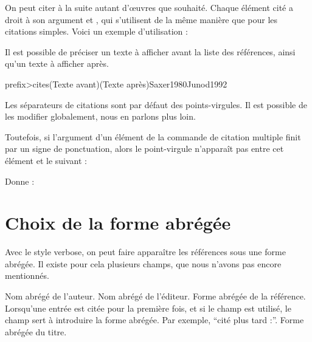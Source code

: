On peut  citer à la suite autant d'œuvres que souhaité. Chaque élément cité a droit à son argument  et , qui s'utilisent de la même manière que pour les citations simples.
Voici un exemple d'utilisation : 

\begin{latexcode}
\autocites{Saxer1980}{Junod1992}
\end{latexcode}

\begin{quotation}
\cites{Saxer1980}{Junod1992}
\end{quotation}

Il est possible de préciser un texte à afficher avant la liste des références, ainsi qu'un texte à afficher après.

\begin{latexcode}
\<prefix>cites(Texte avant)(Texte après){Saxer1980}{Junod1992}
\end{latexcode}

Les séparateurs de citations sont par défaut des points-virgules. Il est possible de les modifier globalement, nous en parlons plus loin.

Toutefois, si l'argument  d'un élément de la commande de citation multiple finit par un signe de ponctuation, alors le point-virgule n'apparaît pas entre cet élément et le suivant :

\begin{latexcode}
\autocites[on consultera également :]{Saxer1980}{Junod1992}
\end{latexcode}

Donne :

\begin{quotation}
\cites[on consultera également :]{Saxer1980}{Junod1992}
\end{quotation}




\section{Choix de la forme abrégée}\label{shortfields}

Avec le style verbose, on peut faire apparaître les références sous une forme abrégée. Il existe pour cela plusieurs champs, que nous n'avons pas encore mentionnés.

\begin{fieldlist}
     Nom abrégé de l'auteur.
     Nom abrégé de l'éditeur.
     Forme abrégée de la référence.
     Lorsqu'une entrée est citée pour la première fois, et si le champ  est utilisé, le champ  sert à introduire la forme abrégée. Par exemple, \enquote{cité plus tard :}.
     Forme abrégée du titre.
\end{fieldlist}

